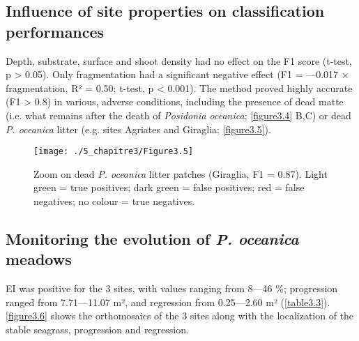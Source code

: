 \subsection{Influence of site properties on classification performances}
Depth, substrate, surface and shoot density had no effect on the F1 score (t-test, p > 0.05). Only fragmentation had a significant negative effect (F1 = ---0.017 \(\times\) fragmentation, R² = 0.50; t-test, p < 0.001). The method proved highly accurate (F1 > 0.8) in various, adverse conditions, including the presence of dead matte (i.e. what remains after the death of \textit{Posidonia oceanica}; \autoref{figure3.4} B,C) or dead \textit{P. oceanica} litter (e.g. sites Agriates and Giraglia; \autoref{figure3.5}). 

\begin{figure}[H]
	\begin{center}
	\texttt{[image: ./5\_chapitre3/Figure3.5]}
		\caption[Zoom on dead \textit{P. oceanica} litter patches.]{Zoom on dead \textit{P. oceanica} litter patches (Giraglia, F1 = 0.87). Light green = true positives; dark green = false positives; red = false negatives; no colour = true negatives.}
	\label{figure3.5}
\end{center}
\end{figure}


\subsection{Monitoring the evolution of \textit{P. oceanica} meadows}
EI was positive for the 3 sites, with values ranging from 8---46 \%; progression ranged from 7.71---11.07 m², and regression from 0.25---2.60 m² (\autoref{table3.3}). \autoref{figure3.6} shows the orthomosaics of the 3 sites along with the localization of the stable seagrass, progression and regression.

